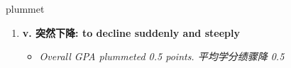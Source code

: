 
\begin{frame}
{\huge plummet}
\begin{center}
\begin{enumerate}\Large
  \item \textbf{v. 突然下降: to decline suddenly and steeply}
  \begin{itemize}
    \item \em{\Large{Overall GPA plummeted 0.5 points. 平均学分绩骤降 0.5}}
  \end{itemize}
\end{enumerate}
\end{center}
\end{frame}
